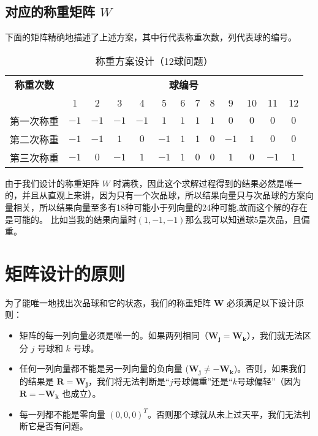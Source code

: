 \documentclass[12pt, a4paper]{ctexart}
\begin{document}
\subsection*{对应的称重矩阵 $W$}
下面的矩阵精确地描述了上述方案，其中行代表称重次数，列代表球的编号。
\begin{table}[h]
    \centering
    \caption{称重方案设计（12球问题）}
    \begin{tabular}{|c|cccccccccccc|}
    \hline
    \textbf{称重次数} & \multicolumn{12}{c|}{\textbf{球编号}} \\
    \cline{2-13}
     & 1 & 2 & 3 & 4 & 5 & 6 & 7 & 8 & 9 & 10 & 11 & 12 \\
    \hline
    第一次称重 & $-1$ & $-1$ & $-1$ & $-1$ & $1$ & $1$ & $1$ & $1$ & $0$ & $0$ & $0$ & $0$ \\
    第二次称重 & $-1$ & $-1$ & $1$ & $0$ & $-1$ & $1$ & $1$ & $0$ & $-1$ & $1$ & $0$ & $0$ \\
    第三次称重 & $-1$ & $0$ & $-1$ & $1$ & $-1$ & $1$ & $0$ & $0$ & $1$ & $0$ & $-1$ & $1$ \\
    \hline
    \end{tabular}
    \end{table}
由于我们设计的称重矩阵 $W$ 时满秩，因此这个求解过程得到的结果必然是唯一的，并且从直观上来讲，因为只有一个次品球，所以结果向量只与次品球的方案向量相关，所以结果向量至多有18种可能小于列向量的24种可能,故而这个解的存在是可能的。
比如当我的结果向量时\((1,-1,-1)\)那么我可以知道球5是次品，且偏重。


\section{矩阵设计的原则}

为了能唯一地找出次品球和它的状态，我们的称重矩阵 $\mathbf{W}$ 必须满足以下设计原则：

\begin{itemize}
    
    
    \item
    矩阵的每一列向量必须是唯一的。如果两列相同（$\mathbf{W_j} = \mathbf{W_k}$），我们就无法区分 $j$ 号球和 $k$ 号球。

    \item
    任何一列向量都不能是另一列向量的负向量 ($\mathbf{W_j} \neq -\mathbf{W_k}$)。否则，如果我们的结果是 $\mathbf{R} = \mathbf{W_j}$，我们将无法判断是“$j$号球偏重”还是“$k$号球偏轻”（因为 $\mathbf{R} = -\mathbf{W_k}$ 也成立）。

    \item
    每一列都不能是零向量 $(0,0,0)^T$。否则那个球就从未上过天平，我们无法判断它是否有问题。
    
    \end{itemize}
\end{document}
